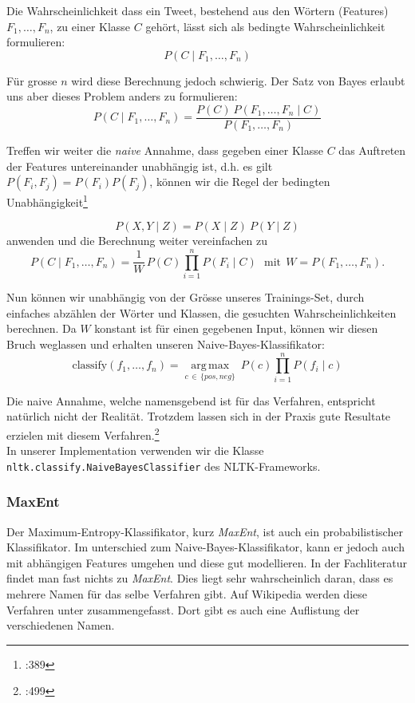 \documentclass[12pt, oneside]{report}   	%
\begin{document}
Die Wahrscheinlichkeit dass ein Tweet, bestehend aus den Wörtern (Features) $F_1,\dots,F_n$, zu einer Klasse $C$ gehört, lässt sich als bedingte Wahrscheinlichkeit formulieren:
$$ P(C \mid F_1,\dots,F_n)$$

Für grosse $n$ wird diese Berechnung jedoch schwierig. Der Satz von Bayes erlaubt uns aber dieses Problem anders zu formulieren:
$$
P(C \mid F_1,\dots,F_n) = \frac{P(C) \ P(F_1,\dots,F_n\mid C )}{P(F_1,\dots,F_n)}
$$

Treffen wir weiter die \emph{naive} Annahme, dass gegeben einer Klasse $C$ das Auftreten der Features untereinander unabhängig ist,
d.h. es gilt $P(F_i,F_j) = P(F_i)P(F_j)$, können wir die Regel der bedingten Unabhängigkeit\footnote{\cite{alp}:389 }

$$ P(X,Y \mid Z) = P(X \mid Z) \ P(Y \mid Z) $$
anwenden und die Berechnung weiter vereinfachen zu
$$
P(C \mid F_1,\dots,F_n) = \frac{1}{W} \, P(C) \prod_{i=1}^n P(F_i\mid C)\ \ \ \mathrm{mit} \ \ W = P(F_1,\dots,F_n).
$$

Nun können wir unabhängig von der Grösse unseres Trainings-Set, durch einfaches abzählen der Wörter und Klassen, die gesuchten Wahrscheinlichkeiten berechnen.
Da $W$ konstant ist für einen gegebenen Input, können wir diesen Bruch weglassen und erhalten unseren Naive-Bayes-Klassifikator:
$$ \mathrm{classify}(f_1,\dots,f_n) = \underset{c \, \in \, \{pos,neg\} }{\operatorname{arg\,max}} \ P(c) \displaystyle\prod_{i=1}^n P(f_i\mid c) $$

Die naive Annahme, welche namensgebend ist für das Verfahren, entspricht natürlich nicht der Realität. 
Trotzdem lassen sich in der Praxis gute Resultate erzielen mit diesem Verfahren.\footnote{\cite{ai}:499}
\\

In unserer Implementation verwenden wir die Klasse\\
 \verb|nltk.classify.NaiveBayesClassifier| des NLTK-Frameworks.
 


\subsubsection{MaxEnt}

Der Maximum-Entropy-Klassifikator, kurz \emph{MaxEnt}, ist auch ein probabilistischer Klassifikator. Im unterschied zum Naive-Bayes-Klassifikator, kann er jedoch auch mit abhängigen Features umgehen und diese gut modellieren.
In der Fachliteratur findet man fast nichts zu \emph{MaxEnt}. Dies liegt sehr wahrscheinlich daran, dass es mehrere Namen für das selbe Verfahren gibt. 
Auf Wikipedia\cite{mlr} werden diese Verfahren unter  zusammengefasst. Dort gibt es auch eine Auflistung der verschiedenen Namen.
\end{document}

